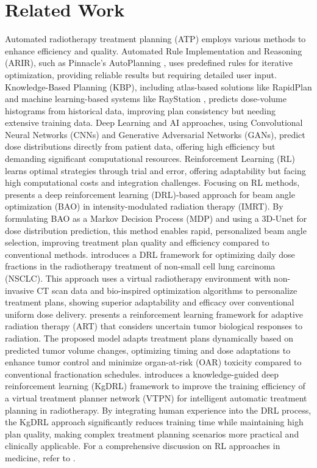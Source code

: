 \section{Related Work}
Automated radiotherapy treatment planning (ATP) employs various methods to enhance efficiency and quality. Automated Rule Implementation and Reasoning (ARIR), such as Pinnacle's AutoPlanning \cite{pinnacle}, uses predefined rules for iterative optimization, providing reliable results but requiring detailed user input. Knowledge-Based Planning (KBP), including atlas-based solutions like RapidPlan \cite{kb} and machine learning-based systems like RayStation \cite{raystation}, predicts dose-volume histograms from historical data, improving plan consistency but needing extensive training data. 
Deep Learning and AI approaches, using Convolutional Neural Networks (CNNs) and Generative Adversarial Networks (GANs), predict dose distributions directly from patient data, offering high efficiency but demanding significant computational resources. Reinforcement Learning (RL) learns optimal strategies through trial and error, offering adaptability but facing high computational costs and integration challenges. Focusing on RL methods, \cite{rl_beam_radiotherapy} presents a deep reinforcement learning (DRL)-based approach for beam angle optimization (BAO) in intensity-modulated radiation therapy (IMRT). By formulating BAO as a Markov Decision Process (MDP) and using a 3D-Unet for dose distribution prediction, this method enables rapid, personalized beam angle selection, improving treatment plan quality and efficiency compared to conventional methods. \cite{rl_radiotherapy_2} introduces a DRL framework for optimizing daily dose fractions in the radiotherapy treatment of non-small cell lung carcinoma (NSCLC). This approach uses a virtual radiotherapy environment with non-invasive CT scan data and bio-inspired optimization algorithms to personalize treatment plans, showing superior adaptability and efficacy over conventional uniform dose delivery. \cite{rl_radiotherapy_3} presents a reinforcement learning framework for adaptive radiation therapy (ART) that considers uncertain tumor biological responses to radiation. The proposed model adapts treatment plans dynamically based on predicted tumor volume changes, optimizing timing and dose adaptations to enhance tumor control and minimize organ-at-risk (OAR) toxicity compared to conventional fractionation schedules. \cite{rl_radiotherapy_4} introduces a knowledge-guided deep reinforcement learning (KgDRL) framework to improve the training efficiency of a virtual treatment planner network (VTPN) for intelligent automatic treatment planning in radiotherapy. By integrating human experience into the DRL process, the KgDRL approach significantly reduces training time while maintaining high plan quality, making complex treatment planning scenarios more practical and clinically applicable. For a comprehensive discussion on RL approaches in medicine, refer to \cite{rl_medicine_survey, rl_medicine_literature_review}. 

